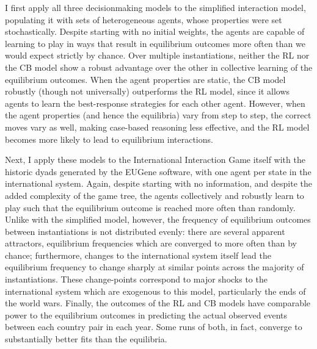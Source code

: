 I first apply all three decisionmaking models to the simplified interaction model, populating it with sets of heterogeneous agents, whose properties were set stochastically. Despite starting with no initial weights, the agents are capable of learning to play in ways that result in equilibrium outcomes more often than we would expect strictly by chance. Over multiple instantiations, neither the RL nor the CB model show a robust advantage over the other in collective learning of the equilibrium outcomes. When the agent properties are static, the CB model robustly (though not universally) outperforms the RL model, since it allows agents to learn the best-response strategies for each other agent. However, when the agent properties (and hence the equilibria) vary from step to step, the correct moves vary as well, making case-based reasoning less effective, and the RL model becomes more likely to lead to equilibrium interactions.

Next, I apply these models to the International Interaction Game itself with the historic dyads generated by the EUGene software, with one agent per state in the international system. Again, despite starting with no information, and despite the added complexity of the game tree, the agents collectively and robustly learn to play such that the equilibrium outcome is reached more often than randomly. Unlike with the simplified model, however, the frequency of equilibrium outcomes between instantiations is not distributed evenly: there are several apparent attractors, equilibrium frequencies which are converged to more often than by chance; furthermore, changes to the international system itself lead the equilibrium frequency to change sharply at similar points across the majority of instantiations. These change-points correspond to major shocks to the international system which are exogenous to this model, particularly the ends of the world wars. Finally, the outcomes of the RL and CB models have comparable power to the equilibrium outcomes in predicting the actual observed events between each country pair in each year. Some runs of both, in fact, converge to substantially better fits than the equilibria. 

